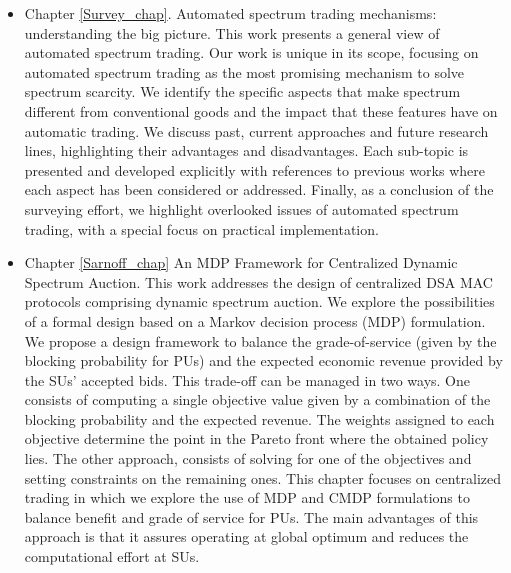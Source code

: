 \begin{itemize}
\item Chapter \ref{Survey_chap}. Automated spectrum trading mechanisms: understanding the big picture.
This work presents a general view of automated spectrum trading.
Our work is unique in its scope, focusing on automated spectrum trading as the most promising mechanism to solve spectrum scarcity.
We identify the specific aspects that make spectrum different from conventional goods and the impact that these features have on automatic trading.
We discuss past, current approaches and future research lines, highlighting their advantages and disadvantages. 
Each sub-topic is presented and developed explicitly with references to previous works where each aspect has been considered or addressed.
Finally, as a conclusion of the surveying effort, we highlight overlooked issues of automated spectrum trading, with a special focus on practical implementation.
\item Chapter \ref{Sarnoff_chap} An MDP Framework for Centralized Dynamic Spectrum Auction.
This work addresses the design of centralized DSA MAC protocols comprising dynamic spectrum auction. We explore the possibilities of a formal design based on a Markov decision process (MDP) formulation. We propose a design framework to balance the grade-of-service (given by the blocking probability for PUs) and the expected economic revenue provided by the SUs' accepted bids. 
This trade-off can be managed in two ways. One consists of computing a single objective value given by a combination of the blocking probability and the expected revenue. 
The weights assigned to each objective determine the point in the Pareto front where the obtained policy lies. The other approach, consists of solving for one of the objectives and setting constraints on the remaining ones.
This chapter focuses on centralized trading in which we explore the use of MDP and CMDP formulations to balance benefit and grade of service for PUs. 
The main advantages of this approach is that it assures operating at global optimum and reduces the computational effort at SUs.

\end{itemize}
